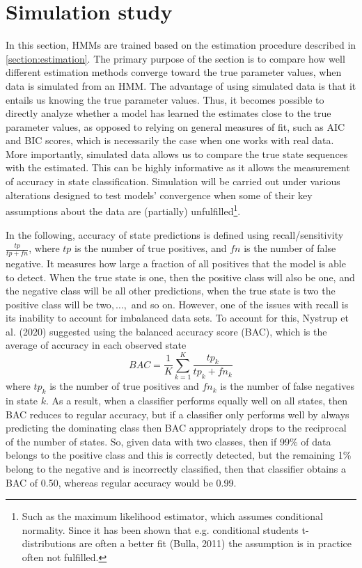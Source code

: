 \newpage

\section{Simulation study}
In this section, HMMs are trained based on the estimation procedure described in \cref{section:estimation}. The primary purpose of the section is to compare how well different estimation methods converge toward the true parameter values, when data is simulated from an HMM. The advantage of using simulated data is that it entails us knowing the true parameter values. Thus, it becomes possible to directly analyze whether a model has learned the estimates close to the true parameter values, as opposed to relying on general measures of fit, such as AIC and BIC scores, which is necessarily the case when one works with real data. More importantly, simulated data allows us to compare the true state sequences with the estimated. This can be highly informative as it allows the measurement of accuracy in state classification. Simulation will be carried out under various alterations designed to test models' convergence when some of their key assumptions about the data are (partially) unfulfilled\footnote
{Such as the maximum likelihood estimator, which assumes conditional normality. Since it has been shown that e.g. conditional students t-distributions are often a better fit (Bulla, 2011) the assumption is in practice often not fulfilled.
}.

In the following, accuracy of state predictions is defined using recall/sensitivity $\frac{tp}{tp+fn}$, where $tp$ is the number of true positives, and $fn$ is the number of false negative. It measures how large a fraction of all positives that the model is able to detect. When the true state is one, then the positive class will also be one, and the negative class will be all other predictions, when the true state is two the positive class will be two$,\ldots,$ and so on. However, one of the issues with recall is its inability to account for imbalanced data sets. To account for this, Nystrup et al. (2020) suggested using the balanced accuracy score (BAC), which is the average of accuracy in each observed state
\begin{equation}
    BAC = \frac{1}{K} \sum_{k=1}^K \frac{tp_k}{tp_k + fn_k}
\end{equation}
where $tp_k$ is the number of true positives and $fn_k$ is the number of false negatives in state $k$. As a result, when a classifier performs equally well on all states, then BAC reduces to regular accuracy, but if a classifier only performs well by always predicting the dominating class then BAC appropriately drops to the reciprocal of the number of states. So, given data with two classes, then if 99\% of data belongs to the positive class and this is correctly detected, but the remaining 1\% belong to the negative and is incorrectly classified, then that classifier obtains a BAC of 0.50, whereas regular accuracy would be 0.99.

